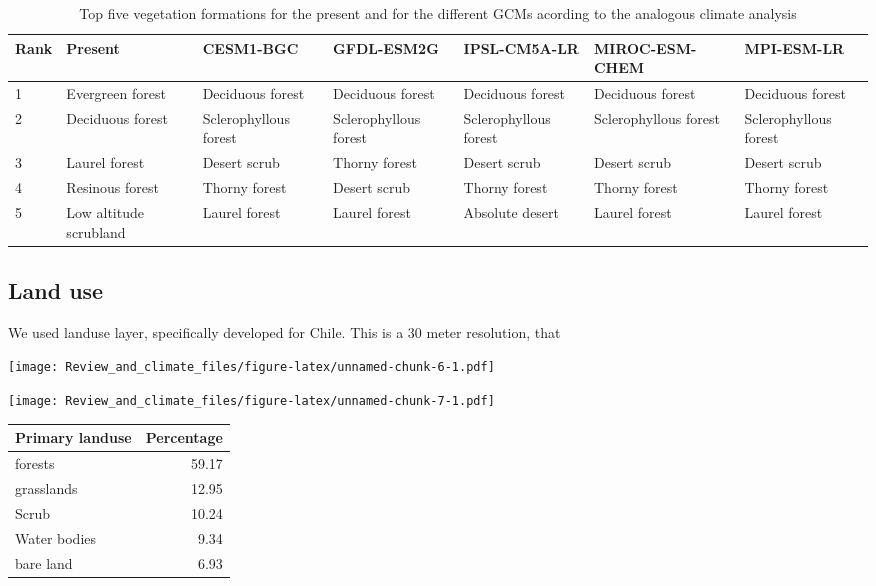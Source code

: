 \documentclass[]{article}
\begin{document}
\begin{table}

\caption{\label{tab:TablaForm}Top five vegetation formations for the present and for the different GCMs acording to the analogous climate analysis}
\centering
\fontsize{5}{7}\selectfont
\begin{tabular}[t]{lllllll}
\toprule
Rank & Present & CESM1-BGC & GFDL-ESM2G & IPSL-CM5A-LR & MIROC-ESM-CHEM & MPI-ESM-LR\\
\midrule
1 & Evergreen
forest & Deciduous
forest & Deciduous
forest & Deciduous
forest & Deciduous
forest & Deciduous
forest\\
2 & Deciduous
forest & Sclerophyllous
forest & Sclerophyllous
forest & Sclerophyllous
forest & Sclerophyllous
forest & Sclerophyllous
forest\\
3 & Laurel
forest & Desert
scrub & Thorny
forest & Desert
scrub & Desert
scrub & Desert
scrub\\
4 & Resinous
forest & Thorny
forest & Desert
scrub & Thorny
forest & Thorny
forest & Thorny
forest\\
5 & Low
altitude
scrubland & Laurel
forest & Laurel
forest & Absolute
desert & Laurel
forest & Laurel
forest\\
\bottomrule
\end{tabular}
\end{table}

\hypertarget{land-use}{%
\subsection{Land use}\label{land-use}}

We used \citet{zhao2016detailed} landuse layer, specifically developed for Chile. This is a 30 meter resolution, that

\texttt{[image: Review\_and\_climate\_files/figure-latex/unnamed-chunk-6-1.pdf]}

\texttt{[image: Review\_and\_climate\_files/figure-latex/unnamed-chunk-7-1.pdf]}

\begin{table}[H]
\centering
\begin{tabular}{lr}
\toprule
Primary landuse & Percentage\\
\midrule
forests & 59.17\\
grasslands & 12.95\\
Scrub & 10.24\\
Water bodies & 9.34\\
bare land & 6.93\\
\bottomrule
\end{tabular}
\end{table}
\end{document}
